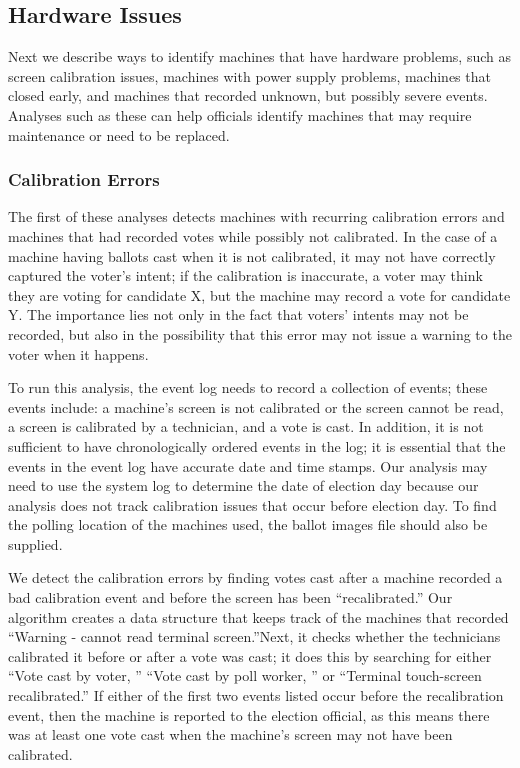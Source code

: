 \subsection{Hardware Issues}
Next we describe ways to identify machines that have hardware problems, such as screen calibration issues, machines with power supply problems, machines that closed early, and machines that recorded unknown, but possibly severe events.  Analyses such as these can help officials identify machines that may require maintenance or need to be replaced.  

\subsubsection{Calibration Errors}
The first of these analyses detects machines with recurring calibration errors and machines that had recorded votes while possibly not calibrated.  In the case of a machine having ballots cast when it is not calibrated, it may not have correctly captured the voter's intent; if the calibration is inaccurate, a voter may think they are voting for candidate X, but the machine may record a vote for candidate Y.  The importance lies not only in the fact that voters' intents may not be recorded, but also in the possibility that this error may not issue a warning to the voter when it happens.    

To run this analysis, the event log needs to record a collection of
events; these events include: a machine's screen is not calibrated or
the screen cannot be read, a screen is calibrated by a technician, and
a vote is cast.  In addition, it is not sufficient to have
chronologically ordered events in the log; it is essential that the
events in the event log have accurate date and time stamps.  Our
analysis may need to use the system log to determine the date of
election day because our analysis does not track calibration issues
that occur before election day.  To find the polling location of the
machines used, the ballot images file should also be supplied.  

We detect the calibration errors by finding votes cast after a machine
recorded a bad calibration event and before the screen has been
\textquotedblleft recalibrated.\textquotedblright \hspace{2 mm}  Our
algorithm creates a data structure that keeps track of the machines
that recorded \textquotedblleft Warning - cannot read terminal
screen.\textquotedblright \hspace{2 mm}Next, it checks whether the
technicians calibrated it before or after a vote was cast; it does
this by searching for either \textquotedblleft Vote cast by voter,
\textquotedblright \hspace{1 mm} \textquotedblleft Vote cast by poll
worker, \textquotedblright \hspace{1 mm} or \textquotedblleft Terminal
touch-screen recalibrated.\textquotedblright \hspace{2 mm} If either
of the first two events listed occur before the recalibration event,
then the machine is reported to the election official, as this means
there was at least one vote cast when the machine's screen may not
have been calibrated.  


